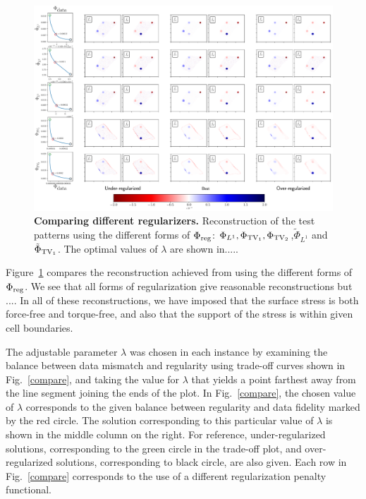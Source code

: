 \documentclass[aps,prl,reprint,twocolumn,groupedaddress,showpacs]{revtex4}
\begin{document}
\begin{figure}
\includegraphics[width=\linewidth]{fig3}
\caption{\textbf{Comparing different regularizers.} Reconstruction of the test
  patterns using the different forms of $\Phi_{\rm reg}$:
  $\Phi_{L^{1}},\Phi_{{\rm TV}_1},\Phi_{{\rm TV}_2}$,$\tilde{\Phi}_{L^{1}}$ and
  $\tilde{\Phi}_{\rm {TV}_{1}}$. The optimal values of $\lambda$ are shown
  in.....}
\label{COMPARE}
\end{figure}
%
Figure~\ref{COMPARE} compares the reconstruction achieved from using
the different forms of $\Phi_{\rm reg}$. We see that 
all forms of regularization give reasonable reconstructions but ....
%
\vspace{1cm}
%
In all of these reconstructions, we have imposed that the surface
stress is both force-free and torque-free, and also that the support
of the stress is within given cell boundaries.

The adjustable parameter $\lambda$ was chosen in each instance by
examining the balance between data mismatch and regularity using
trade-off curves shown in Fig.~\ref{compare}, and taking the value
for $\lambda$ that yields a point farthest away from the line segment
joining the ends of the plot. In Fig.~\ref{compare}, the chosen value
of $\lambda$ corresponds to the given balance between regularity and
data fidelity marked by the red circle. The solution corresponding to
this particular value of $\lambda$ is shown in the middle column on
the right. For reference, under-regularized solutions, corresponding
to the green circle in the trade-off plot, and over-regularized
solutions, corresponding to black circle, are also given. Each row in
Fig.~\ref{compare} corresponds to the use of a different
regularization penalty functional. 
\end{document}
